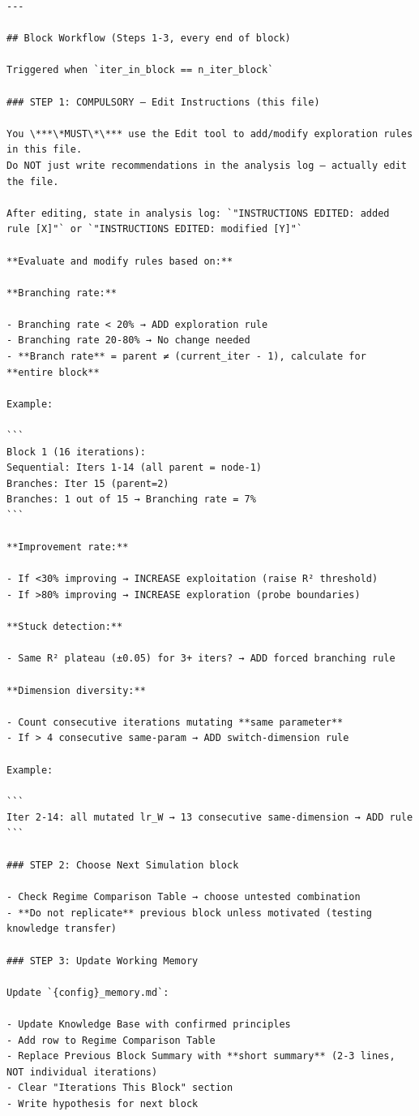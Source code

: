 \documentclass[10pt,twocolumn]{article}
\begin{document}
\begin{small}
\begin{verbatim}
---

## Block Workflow (Steps 1-3, every end of block)

Triggered when `iter_in_block == n_iter_block`

### STEP 1: COMPULSORY — Edit Instructions (this file)

You \***\*MUST\*\*** use the Edit tool to add/modify exploration rules in this file.
Do NOT just write recommendations in the analysis log — actually edit the file.

After editing, state in analysis log: `"INSTRUCTIONS EDITED: added rule [X]"` or `"INSTRUCTIONS EDITED: modified [Y]"`

**Evaluate and modify rules based on:**

**Branching rate:**

- Branching rate < 20% → ADD exploration rule
- Branching rate 20-80% → No change needed
- **Branch rate** = parent ≠ (current_iter - 1), calculate for **entire block**

Example:

```
Block 1 (16 iterations):
Sequential: Iters 1-14 (all parent = node-1)
Branches: Iter 15 (parent=2)
Branches: 1 out of 15 → Branching rate = 7%
```

**Improvement rate:**

- If <30% improving → INCREASE exploitation (raise R² threshold)
- If >80% improving → INCREASE exploration (probe boundaries)

**Stuck detection:**

- Same R² plateau (±0.05) for 3+ iters? → ADD forced branching rule

**Dimension diversity:**

- Count consecutive iterations mutating **same parameter**
- If > 4 consecutive same-param → ADD switch-dimension rule

Example:

```
Iter 2-14: all mutated lr_W → 13 consecutive same-dimension → ADD rule
```

### STEP 2: Choose Next Simulation block

- Check Regime Comparison Table → choose untested combination
- **Do not replicate** previous block unless motivated (testing knowledge transfer)

### STEP 3: Update Working Memory

Update `{config}_memory.md`:

- Update Knowledge Base with confirmed principles
- Add row to Regime Comparison Table
- Replace Previous Block Summary with **short summary** (2-3 lines, NOT individual iterations)
- Clear "Iterations This Block" section
- Write hypothesis for next block


\end{verbatim}
\end{small}
\end{document}
